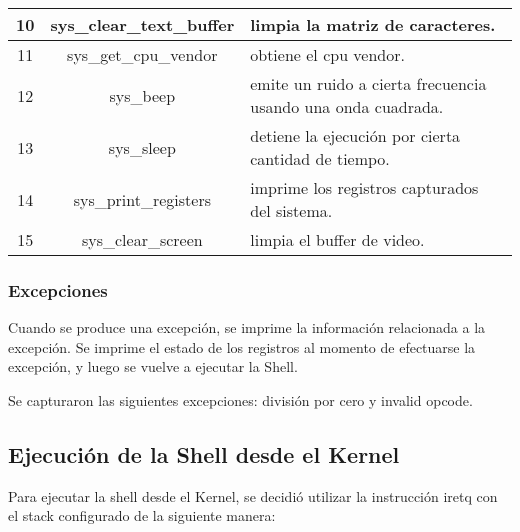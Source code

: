\documentclass{article}
\begin{document}
\begin{center}
\begin{tabular}{|c|c|l|}
10 & sys\_clear\_text\_buffer &  \begin{minipage}{80mm}limpia la matriz de caracteres.\end{minipage} \\ \hline
11 & sys\_get\_cpu\_vendor &  \begin{minipage}{80mm}obtiene el cpu vendor. \end{minipage} \\ \hline
12 & sys\_beep &  \begin{minipage}{80mm}emite un ruido a cierta frecuencia usando una onda cuadrada.\end{minipage} \\ \hline
13 & sys\_sleep &  \begin{minipage}{80mm}detiene la ejecución por cierta cantidad de tiempo.\end{minipage} \\ \hline
14 & sys\_print\_registers &  \begin{minipage}{80mm}imprime los registros capturados del sistema.\end{minipage} \\ \hline
15 & sys\_clear\_screen &  \begin{minipage}{80mm}limpia el buffer de video.\end{minipage} \\ \hline
\end{tabular}
\label{table:syscalls}
\end{center}

\subsubsection {Excepciones}

Cuando se produce una excepción, se imprime la información relacionada a la excepción. Se imprime el estado de los registros al momento de efectuarse la excepción, y luego se vuelve a ejecutar la Shell.

Se capturaron las siguientes excepciones: división por cero y invalid opcode.

\subsection {Ejecución de la Shell desde el Kernel}

Para ejecutar la shell desde el Kernel, se decidió utilizar la instrucción iretq con el stack configurado de la siguiente manera:
\end{document}
